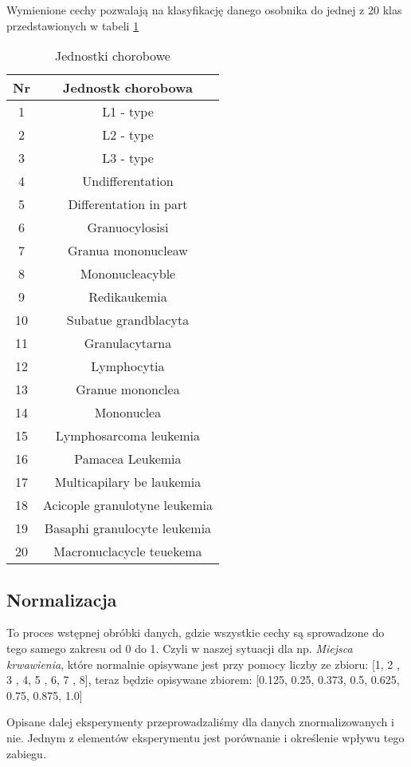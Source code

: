 	Wymienione cechy pozwalają na klasyfikację danego osobnika do jednej z 20 klas przedstawionych w tabeli \ref{2}

	\begin{table}[h!]
		\centering
		\begin{tabular}{||c | c ||} 
			\hline
			Nr & Jednostk chorobowa \\ [0.5ex] 
			\hline\hline
			1 & L1 - type \\ 
			2 & L2 - type \\
			3 & L3 - type \\
			4 & Undifferentation \\
			5 & Differentation in part \\
			6 & Granuocylosisi \\
			7 & Granua mononucleaw \\
			8 & Mononucleacyble \\
			9 & Redikaukemia \\
			10 & Subatue grandblacyta \\
			11 & Granulacytarna \\
			12 & Lymphocytia \\
			13 & Granue mononclea \\
			14 & Mononuclea \\
			15 & Lymphosarcoma leukemia \\
			16 & Pamacea Leukemia \\
			17 & Multicapilary be laukemia \\
			18 & Acicople granulotyne leukemia \\
			19 & Basaphi granulocyte leukemia \\
			20 & Macronuclacycle teuekema \\ [1ex] 
			\hline
		\end{tabular}
		\caption{Jednostki chorobowe}
		\label{2}
	\end{table}

	\subsection{Normalizacja}
		To proces wstępnej obróbki danych, gdzie wszystkie cechy są sprowadzone do tego samego zakresu od 0 do 1. Czyli w naszej sytuacji dla np.  \textit{Miejsca krwawienia}, które normalnie opisywane jest przy pomocy liczby ze zbioru: [1, 2 , 3 , 4,  5 , 6, 7 , 8], teraz będzie opisywane zbiorem: [0.125, 0.25, 0.373, 0.5, 0.625, 0.75, 0.875, 1.0]
	
		Opisane dalej eksperymenty przeprowadzaliśmy dla danych znormalizowanych i nie. Jednym z elementów eksperymentu jest porównanie i określenie wpływu tego zabiegu.